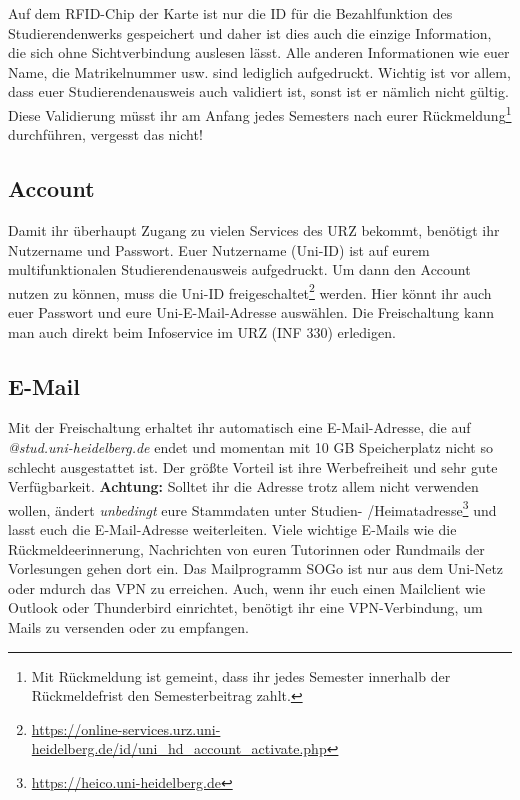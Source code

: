 Auf dem RFID-Chip der Karte ist nur die ID für die Bezahlfunktion des Studierendenwerks gespeichert und daher ist dies auch die einzige Information, die sich ohne Sichtverbindung auslesen lässt. 
Alle anderen Informationen wie euer Name, die Matrikelnummer usw. sind lediglich aufgedruckt. Wichtig ist vor allem, dass euer Studierendenausweis auch validiert ist, sonst ist er nämlich nicht gültig. Diese Validierung müsst ihr am Anfang jedes Semesters nach eurer Rückmeldung\footnote{Mit Rückmeldung ist gemeint, dass ihr jedes Semester innerhalb der Rückmeldefrist den Semesterbeitrag zahlt.} durchführen, vergesst das nicht!

\subsection{Account}
Damit ihr überhaupt Zugang zu vielen Services des URZ bekommt, benötigt ihr Nutzername und Passwort. Euer Nutzername (Uni-ID) ist auf eurem multifunktionalen Studierendenausweis aufgedruckt. Um dann den Account nutzen zu können, muss die Uni-ID freigeschaltet\footnote{\url{https://online-services.urz.uni-heidelberg.de/id/uni_hd_account_activate.php}} werden. Hier könnt ihr auch euer Passwort und eure Uni-E-Mail-Adresse auswählen. Die Freischaltung kann man auch direkt beim Infoservice im URZ (INF 330) erledigen.

\vspace*{-2mm}
\subsection{E-Mail}
\vspace*{-1mm}
Mit der Freischaltung erhaltet ihr automatisch eine E-Mail-Adresse, die auf \emph{@stud.uni-heidelberg.de} endet und momentan mit 10 GB Speicherplatz nicht so schlecht ausgestattet ist. Der größte Vorteil ist ihre Werbefreiheit und sehr gute Verfügbarkeit. \textbf{Achtung:} Solltet ihr die Adresse trotz allem nicht verwenden wollen, ändert \emph{unbedingt} eure Stammdaten unter Studien- /Heimatadresse\footnote{\url{https://heico.uni-heidelberg.de}} und lasst euch die E-Mail-Adresse weiterleiten. Viele wichtige E-Mails wie die Rückmeldeerinnerung, Nachrichten von euren Tutorinnen oder Rundmails der Vorlesungen gehen dort ein. Das Mailprogramm SOGo ist nur aus dem Uni-Netz oder mdurch das VPN zu erreichen. Auch, wenn ihr euch einen Mailclient wie Outlook oder Thunderbird einrichtet, benötigt ihr eine VPN-Verbindung, um Mails zu versenden oder zu empfangen.

